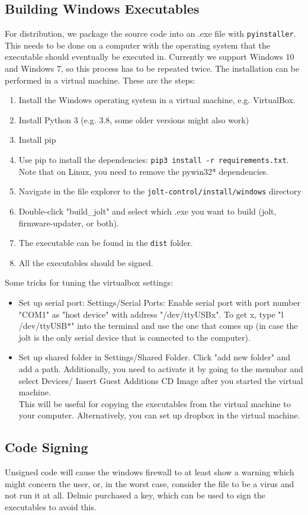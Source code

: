 \documentclass[]{article}
\begin{document}
\subsection{Building Windows Executables}
For distribution, we package the source code into an .exe file with \texttt{pyinstaller}. This needs to be done on a computer with the operating system that the executable should eventually be executed in. Currently we support Windows 10 and Windows 7, so this process has to be repeated twice. The installation can be performed in a virtual machine. 
These are the steps:
\begin{enumerate}
	\item Install the Windows operating system in a virtual machine, e.g. VirtualBox.
	\item Install Python 3 (e.g. 3.8, some older versions might also work)
	\item Install pip
	\item Use pip to install the dependencies: \texttt{pip3 install -r requirements.txt}. Note that on Linux, you need to remove the pywin32* dependencies.
	\item Navigate in the file explorer to the \texttt{jolt-control/install/windows} directory
	\item Double-click "build\_jolt" and select which .exe you want to build (jolt, firmware-updater, or both).
	\item The executable can be found in the \texttt{dist} folder.
	\item All the executables should be signed.
\end{enumerate}
Some tricks for tuning the virtualbox settings:
\begin{itemize}
	\item Set up serial port: Settings/Serial Ports: Enable serial port with port number "COM1" as "host device" with address "/dev/ttyUSBx". To get x, type "l /dev/ttyUSB*" into the terminal and use the one that comes up (in case the jolt is the only serial device that is connected to the computer).
	\item Set up shared folder in Settings/Shared Folder. Click "add new folder" and add a path. Additionally, you need to activate it by going to the menubar and select Devices/ Insert Guest Additions CD Image after you started the virtual machine.\\
	This will be useful for copying the executables from the virtual machine to your computer. Alternatively, you can set up dropbox in the virtual machine.
\end{itemize}

\subsection{Code Signing}
Unsigned code will cause the windows firewall to at least show a warning which might concern the user, or, in the worst case, consider the file to be a virus and not run it at all. Delmic purchased a key, which can be used to sign the executables to avoid this.
\end{document}
